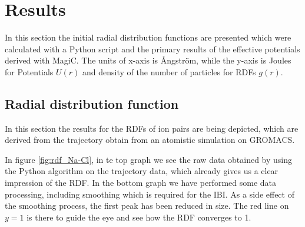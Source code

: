 \documentclass[10pt]{article}
\begin{document}
        
\section{Results}

    \label{Results}

    In this section the initial radial distribution functions are presented which were calculated with a Python script and the primary results of the effective potentials derived with MagiC. The units of x-axis is Ångström, while the y-axis is Joules for Potentials $U(r)$ and density of the number of particles for RDFs $g(r)$.

    
    
    

    \subsection{Radial distribution function}
        \label{r:rdf}

        In this section the results for the RDFs of ion pairs are being depicted, which are derived from the trajectory obtain from an atomistic simulation on GROMACS.
        
        In figure \ref{fig:rdf_Na-Cl}, in te top graph we see the raw data obtained by using the Python algorithm on the trajectory data, which already gives us a clear impression of the RDF. In the bottom graph we have performed some data processing, including smoothing which is required for the IBI. As a side effect of the smoothing process, the first peak has been reduced in size. The red line on $y = 1$ is there to guide the eye and see how the RDF converges to 1.
    
\end{document}
